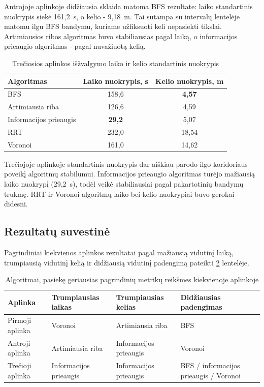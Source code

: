 \documentclass[]{VUMIFTemplateClass}
\begin{document}
Antrojoje aplinkoje didžiausia sklaida matoma BFS rezultate: laiko standartinis nuokrypis siekė 161,2~s, o kelio - 9,18~m. Tai sutampa su intervalų
lentelėje matomu ilgu BFS bandymu, kuriame užfiksuoti keli nepasiekti tikslai. Artimiausios ribos algoritmas buvo stabiliausias pagal laiką, o informacijos
prieaugio algoritmas - pagal nuvažiuotą kelią.

\begin{table}[H]
\centering
\caption{Trečiosios aplinkos išžvalgymo laiko ir kelio standartinis nuokrypis}
\label{tab:std-dev-room3}
\small
\setlength{\tabcolsep}{4pt}
\begin{tabular}{|l|c|c|}
\hline
\textbf{Algoritmas} & \textbf{Laiko nuokrypis, s} & \textbf{Kelio nuokrypis, m} \\
\hline
BFS & 158,6 & \textbf{4,57} \\
\hline
Artimiausia riba & 126,6 & 4,59 \\
\hline
Informacijos prieaugis & \textbf{29,2} & 5,07 \\
\hline
RRT & 232,0 & 18,54 \\
\hline
Voronoi & 161,0 & 14,62 \\
\hline
\end{tabular}
\end{table}

Trečiojoje aplinkoje standartinis nuokrypis dar aiškiau parodo ilgo koridoriaus poveikį algoritmų stabilumui. Informacijos prieaugio algoritmas turėjo mažiausią
laiko nuokrypį (29,2~s), todėl veikė stabiliausiai pagal pakartotinių bandymų trukmę. RRT ir Voronoi algoritmų laiko bei kelio nuokrypiai buvo gerokai didesni.

\subsection{Rezultatų suvestinė}

Pagrindiniai kiekvienos aplinkos rezultatai pagal mažiausią vidutinį laiką, trumpiausią vidutinį kelią ir didžiausią vidutinį padengimą pateikti
\ref{tab:best-results-summary} lentelėje.

\begin{table}[H]
\centering
\caption{Algoritmai, pasiekę geriausias pagrindinių metrikų reikšmes kiekvienoje aplinkoje}
\label{tab:best-results-summary}
\begin{tabular}{|l|l|l|p{}|}
\hline
\textbf{Aplinka} & \textbf{Trumpiausias laikas} & \textbf{Trumpiausias kelias} & \textbf{Didžiausias padengimas} \\
\hline
Pirmoji aplinka & Voronoi & Artimiausia riba & BFS \\
\hline
Antroji aplinka & Artimiausia riba & Informacijos prieaugis & Voronoi \\
\hline
Trečioji aplinka & Informacijos prieaugis & Informacijos prieaugis & BFS / informacijos prieaugis / Voronoi \\
\hline
\end{tabular}
\end{table}
\end{document}

